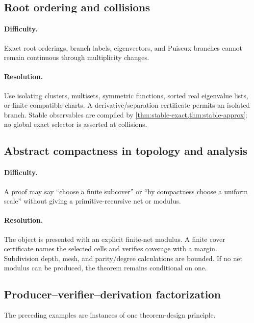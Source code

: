 \subsection{Root ordering and collisions}

\paragraph{Difficulty.}
Exact root orderings, branch labels, eigenvectors, and Puiseux branches cannot remain continuous through multiplicity changes.

\paragraph{Resolution.}
Use isolating clusters, multisets, symmetric functions, sorted real eigenvalue lists, or finite compatible charts.  A derivative/separation certificate permits an isolated branch.  Stable observables are compiled by \cref{thm:stable-exact,thm:stable-approx}; no global exact selector is asserted at collisions.

\subsection{Abstract compactness in topology and analysis}

\paragraph{Difficulty.}
A proof may say ``choose a finite subcover'' or ``by compactness choose a uniform scale'' without giving a primitive-recursive net or modulus.

\paragraph{Resolution.}
The object is presented with an explicit finite-net modulus.  A finite cover certificate names the selected cells and verifies coverage with a margin.  Subdivision depth, mesh, and parity/degree calculations are bounded.  If no net modulus can be produced, the theorem remains conditional on one.

\subsection{Producer--verifier--derivation factorization}

The preceding examples are instances of one theorem-design principle.

